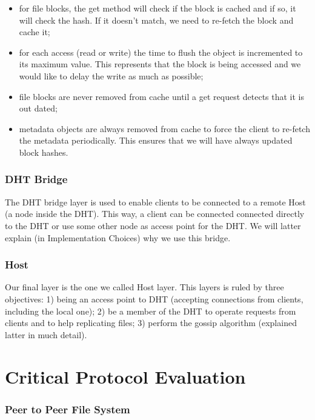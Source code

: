 \documentclass[times,9pt,article]{llncs}
\begin{document}
\begin{itemize}
\item for file blocks, the get method will check if the block is cached and if so, it will check the hash. If it doesn't match, we need to re-fetch the block and cache it;
\item for each access (read or write) the time to flush the object is incremented to its maximum value. This represents that the block is being accessed and we would like to delay the write as much as possible;
\item file blocks are never removed from cache until a get request detects that it is out dated;
\item metadata objects are always removed from cache to force the client to re-fetch the metadata periodically. This ensures that we will have always updated block hashes.
\end{itemize}

\subsubsection{DHT Bridge}

The DHT bridge layer is used to enable clients to be connected to a remote Host (a node inside the DHT). This way, a client can be connected connected directly to the DHT or use some other node as access point for the DHT. We will latter explain (in Implementation Choices) why we use this bridge.

\subsubsection{Host}
Our final layer is the one we called Host layer. This layers is ruled by three objectives: 1) being an access point to DHT (accepting connections from clients, including the local one); 2) be a member of the DHT to operate requests from clients and to help replicating files; 3) perform the gossip algorithm (explained latter in much detail).

\section{Critical Protocol Evaluation}

\subsubsection{Peer to Peer File System}
\end{document}
